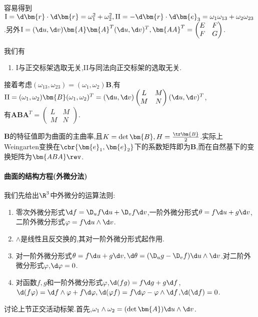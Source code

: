 \documentclass{article}
\begin{document}
容易得到$\mathrm{I}=\d\bm{r}\cdot\d\bm{r}=\omega_1^2+\omega_2^2, \mathrm{II}=-\d\bm{r}\cdot\d\bm{e}_3=\omega_1\omega_{13}+\omega_2\omega_{23}$.另外$\mathrm{I}=(\d u,\d v)\bm{A}\bm{A}^T(\d u,\d v)^T, \bm{AA}^T=\begin{pmatrix}E&F\\F&G\end{pmatrix}$.

我们有\begin{enumerate}[resume]
    \item I与正交标架选取无关,II与同法向正交标架的选取无关.
\end{enumerate}

接着考虑$(\omega_{13},\omega_{23})=(\omega_1,\omega_2)\bm{B}$,有$\mathrm{II}=(\omega_1,\omega_2)\bm{B}(\omega_1,\omega_2)^T=(\d u,\d v)\begin{pmatrix}L&M\\M&N\end{pmatrix}(\d u,\d v)^T$,\\有$\bm{ABA}^T=\begin{pmatrix}L&M\\M&N\end{pmatrix}.$

$\bm{B}$的特征值即为曲面的主曲率,且$K=\det\bm{B},H=\frac{\tr \bm{B}}{2}$.实际上Weingarten变换在$\cbr{\bm{e}_1,\bm{e}_2}$下的系数矩阵即为$\bm{B}$,而在自然基下的变换矩阵为$\bm{ABA}\rev$.

\paragraph{曲面的结构方程(外微分法)}
我们先给出$\R^3$中外微分的运算法则:\begin{enumerate}
    \item 零次外微分形式$\d f=\D_uf \d u+\D_vf \d v$,一阶外微分形式$\theta=f\d u+g\d v$,二阶外微分形式$\varphi=f\d u\wedge\d v$.
    \item $\wedge$是线性且反交换的,其对一阶外微分形式起作用.
    \item 对一阶外微分形式$\theta=f\d u+g\d v, \d \theta=(\D_u g-\D_v f)\d u\wedge\d v$.对二阶外微分形式$\varphi$,$\d\varphi=0$.
    \item 对函数$f,g$和一阶外微分形式$\varphi$,$\d(fg)=f\d g+g\d f$,$\d(f\varphi)=\d f\wedge \varphi+f\d\varphi, \d(\varphi f)=f\d \varphi-\varphi\wedge\d f$,$\d(\d f)=0$.
\end{enumerate}

讨论上节正交活动标架.首先,$\omega_1\wedge\omega_2=(\det \bm{A})\d u \wedge\d v$.
\end{document}
